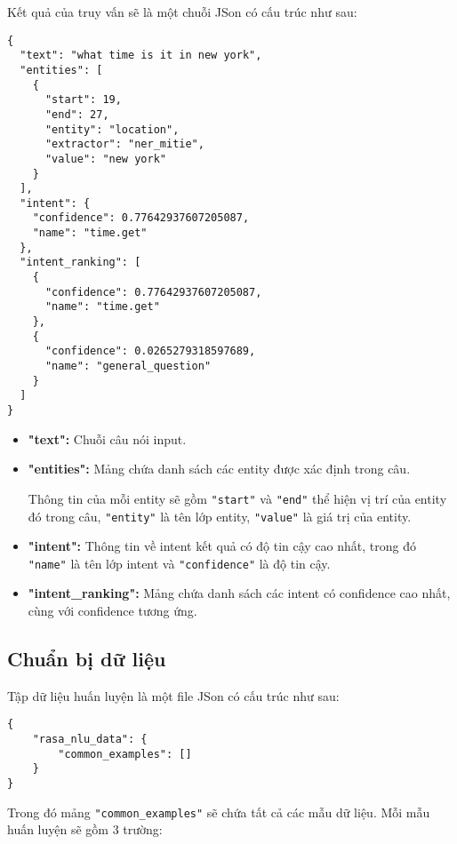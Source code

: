Kết quả của truy vấn sẽ là một chuỗi JSon có cấu trúc như sau:

\begin{lstlisting}
{
  "text": "what time is it in new york",
  "entities": [
    {
      "start": 19,
      "end": 27, 
      "entity": "location", 
      "extractor": "ner_mitie",  
      "value": "new york"
    }
  ], 
  "intent": {
    "confidence": 0.77642937607205087, 
    "name": "time.get"
  }, 
  "intent_ranking": [
    {
      "confidence": 0.77642937607205087, 
      "name": "time.get"
    }, 
    {
      "confidence": 0.0265279318597689, 
      "name": "general_question"
    }
  ]
}
\end{lstlisting}

\begin{itemize}
    \item \textbf{"text":} Chuỗi câu nói input.
    
    \item \textbf{"entities":} Mảng chứa danh sách các entity được xác định trong câu.
    
    Thông tin của mỗi entity sẽ gồm \lstinline{"start"} và \lstinline{"end"} thể hiện vị trí của entity đó trong câu, \lstinline{"entity"} là tên lớp entity, \lstinline{"value"} là giá trị của entity.
    
    \item \textbf{"intent":} Thông tin về intent kết quả có độ tin cậy cao nhất, trong đó \lstinline{"name"} là tên lớp intent và \lstinline{"confidence"} là độ tin cậy.
    
    \item \textbf{"intent\_ranking":} Mảng chứa danh sách các intent có confidence cao nhất, cùng với confidence tương ứng.
\end{itemize}

\subsection{Chuẩn bị dữ liệu}

Tập dữ liệu huấn luyện là một file JSon có cấu trúc như sau:

\begin{lstlisting}
{
    "rasa_nlu_data": {
        "common_examples": []
    }
}
\end{lstlisting}

Trong đó mảng \lstinline{"common_examples"} sẽ chứa tất cả các mẫu dữ liệu. Mỗi mẫu huấn luyện sẽ gồm 3 trường:

